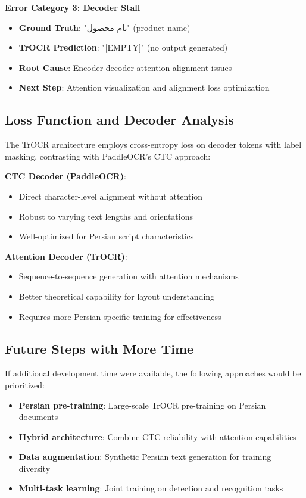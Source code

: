 \documentclass[11pt,a4paper]{article}
\begin{document}
\textbf{Error Category 3: Decoder Stall}
\begin{itemize}
  \item \textbf{Ground Truth}: "نام محصول" (product name)
  \item \textbf{TrOCR Prediction}: "[EMPTY]" (no output generated)
  \item \textbf{Root Cause}: Encoder-decoder attention alignment issues
  \item \textbf{Next Step}: Attention visualization and alignment loss optimization
\end{itemize}

\subsection{Loss Function and Decoder Analysis}
The TrOCR architecture employs cross-entropy loss on decoder tokens with label masking, contrasting with PaddleOCR's CTC approach:

\textbf{CTC Decoder (PaddleOCR)}:
\begin{itemize}
  \item Direct character-level alignment without attention
  \item Robust to varying text lengths and orientations
  \item Well-optimized for Persian script characteristics
\end{itemize}

\textbf{Attention Decoder (TrOCR)}:
\begin{itemize}
  \item Sequence-to-sequence generation with attention mechanisms
  \item Better theoretical capability for layout understanding
  \item Requires more Persian-specific training for effectiveness
\end{itemize}

\subsection{Future Steps with More Time}
If additional development time were available, the following approaches would be prioritized:
\begin{itemize}
  \item \textbf{Persian pre-training}: Large-scale TrOCR pre-training on Persian documents
  \item \textbf{Hybrid architecture}: Combine CTC reliability with attention capabilities
  \item \textbf{Data augmentation}: Synthetic Persian text generation for training diversity
  \item \textbf{Multi-task learning}: Joint training on detection and recognition tasks
\end{itemize}
\end{document}

